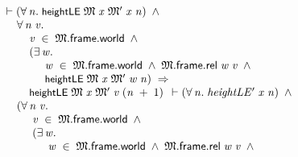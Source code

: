 \documentclass[letterpaper]{article}
\renewcommand{\HOLConst}[1]{{\textsf{\upshape\small #1}}}
\newenvironment{holmath}{\begin{displaymath}\begin{array}{l}}{\end{array}\end{displaymath}\ignorespacesafterend}
\begin{document}
\begin{holmath}
  \ensuremath{\HOLTokenTurnstile}(\HOLSymConst{\HOLTokenForall{}}\HOLBoundVar{n}.\;\HOLConst{heightLE}\;\HOLFreeVar{\ensuremath{\mathfrak{M}}}\;\HOLFreeVar{x}\;\HOLFreeVar{\ensuremath{\mathfrak{M}'}}\;\HOLFreeVar{x}\;\HOLBoundVar{n})\;\HOLSymConst{\HOLTokenConj{}}\\
\;\;\;\;\;\HOLSymConst{\HOLTokenForall{}}\HOLBoundVar{n}\;\HOLBoundVar{v}.\\
\;\;\;\;\;\;\;\;\;\HOLBoundVar{v}\;\HOLSymConst{\HOLTokenIn{}}\;\HOLFreeVar{\ensuremath{\mathfrak{M}}}.\HOLFieldName{frame}.\HOLFieldName{world}\;\HOLSymConst{\HOLTokenConj{}}\\
\;\;\;\;\;\;\;\;\;(\HOLSymConst{\HOLTokenExists{}}\HOLBoundVar{w}.\\
\;\;\;\;\;\;\;\;\;\;\;\;\;\;\HOLBoundVar{w}\;\HOLSymConst{\HOLTokenIn{}}\;\HOLFreeVar{\ensuremath{\mathfrak{M}}}.\HOLFieldName{frame}.\HOLFieldName{world}\;\HOLSymConst{\HOLTokenConj{}}\;\HOLFreeVar{\ensuremath{\mathfrak{M}}}.\HOLFieldName{frame}.\HOLFieldName{rel}\;\HOLBoundVar{w}\;\HOLBoundVar{v}\;\HOLSymConst{\HOLTokenConj{}}\\
\;\;\;\;\;\;\;\;\;\;\;\;\;\;\HOLConst{heightLE}\;\HOLFreeVar{\ensuremath{\mathfrak{M}}}\;\HOLFreeVar{x}\;\HOLFreeVar{\ensuremath{\mathfrak{M}'}}\;\HOLBoundVar{w}\;\HOLBoundVar{n})\;\HOLSymConst{\HOLTokenImp{}}\\
\;\;\;\;\;\;\;\;\;\HOLConst{heightLE}\;\HOLFreeVar{\ensuremath{\mathfrak{M}}}\;\HOLFreeVar{x}\;\HOLFreeVar{\ensuremath{\mathfrak{M}'}}\;\HOLBoundVar{v}\;(\HOLBoundVar{n}\;\HOLSymConst{\ensuremath{+}}\;\HOLNumLit{1})
  \ensuremath{\HOLTokenTurnstile}(\HOLSymConst{\HOLTokenForall{}}\HOLBoundVar{n}.\;\HOLFreeVar{heightLE\sp{\prime}}\;\HOLFreeVar{x}\;\HOLBoundVar{n})\;\HOLSymConst{\HOLTokenConj{}}\\
\;\;\;\;\;(\HOLSymConst{\HOLTokenForall{}}\HOLBoundVar{n}\;\HOLBoundVar{v}.\\
\;\;\;\;\;\;\;\;\;\;\HOLBoundVar{v}\;\HOLSymConst{\HOLTokenIn{}}\;\HOLFreeVar{\ensuremath{\mathfrak{M}}}.\HOLFieldName{frame}.\HOLFieldName{world}\;\HOLSymConst{\HOLTokenConj{}}\\
\;\;\;\;\;\;\;\;\;\;(\HOLSymConst{\HOLTokenExists{}}\HOLBoundVar{w}.\\
\;\;\;\;\;\;\;\;\;\;\;\;\;\;\;\HOLBoundVar{w}\;\HOLSymConst{\HOLTokenIn{}}\;\HOLFreeVar{\ensuremath{\mathfrak{M}}}.\HOLFieldName{frame}.\HOLFieldName{world}\;\HOLSymConst{\HOLTokenConj{}}\;\HOLFreeVar{\ensuremath{\mathfrak{M}}}.\HOLFieldName{frame}.\HOLFieldName{rel}\;\HOLBoundVar{w}\;\HOLBoundVar{v}\;\HOLSymConst{\HOLTokenConj{}}\\

\end{holmath}
\end{document}
